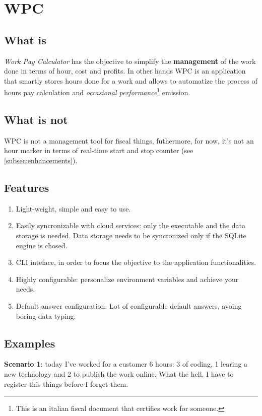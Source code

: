

\section{WPC}

\subsection{What is}
\textit{Work Pay Calculator} has the objective to simplify the \textbf{management} of the work done in terms of hour, cost and profits. In other hands WPC is an application that smartly stores hours done for a work and allows to automatize the process of hours pay calculation and \textit{occasional performance}\footnote{This is an italian fiscal document that certifies work for someone.} emission.

\subsection{What is not}
WPC is not a management tool for fiscal things, futhermore, for now, it's not an hour marker in terms of real-time start and stop counter (see \ref{subsec:enhancements}).

\subsection{Features}
\begin{enumerate}[label=(\alph*)]
\item Light-weight, simple and easy to use.
\item Easily syncronizable with cloud services: only the executable and the data storage is needed. Data storage needs to be syncronized only if the SQLite engine is chosed.
\item CLI inteface, in order to focus the objective to the application functionalities.
\item Highly configurable: personalize environment variables and achieve your needs.
\item Default answer configuration. Lot of configurable default answers, avoing boring data typing.
\end{enumerate}

\subsection{Examples}
\textbf{Scenario 1}: today I've worked for a customer 6 hours: 3 of coding, 1 learing a new technology and 2 to publish the work online. What the hell, I have to register this things before I forget them.

